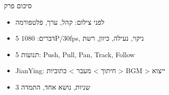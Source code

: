\begin{tcbsummary}{סיכום פרק}
\begin{itemize}
  \item לפני צילום: קהל, ערך, פלטפורמה
  \item 5 דברים: 1080P/30fps, ניקוי, נעילה, כיוון, רשת
  \item 5 תנועות: Push, Pull, Pan, Track, Follow
  \item JianYing: חיתוך > מעבר > כתוביות > BGM > ייצוא
  \item 3 שניות, נושא אחד, התמדה
\end{itemize}

\end{tcbsummary}
